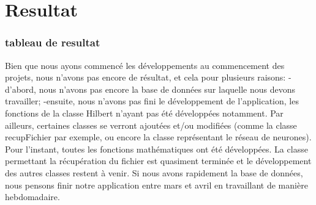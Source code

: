  \part{Resultat} %
 \label{prt:resultat_}
 
	\section{tableau de resultat} %
		\label{sec:tableau_de_resultat}
		
		Bien que nous ayons commencé les développements au commencement des projets, nous n'avons pas encore de résultat, et cela pour plusieurs raisons:
		-d'abord, nous n'avons pas encore la base de données sur laquelle nous devons travailler;
		-ensuite, nous n'avons pas fini le développement de l'application, les fonctions de la classe Hilbert n'ayant pas été développées notamment. Par ailleurs, certaines classes se verront ajoutées et/ou modifiées (comme la classe recupFichier par exemple, ou encore la classe représentant le réseau de neurones).
		Pour l'instant, toutes les fonctions mathématiques ont été développées. La classe permettant la récupération du fichier est quasiment terminée et le développement des autres classes restent à venir.
		Si nous avons rapidement la base de données, nous pensons finir notre application entre mars et avril en travaillant de manière hebdomadaire.


